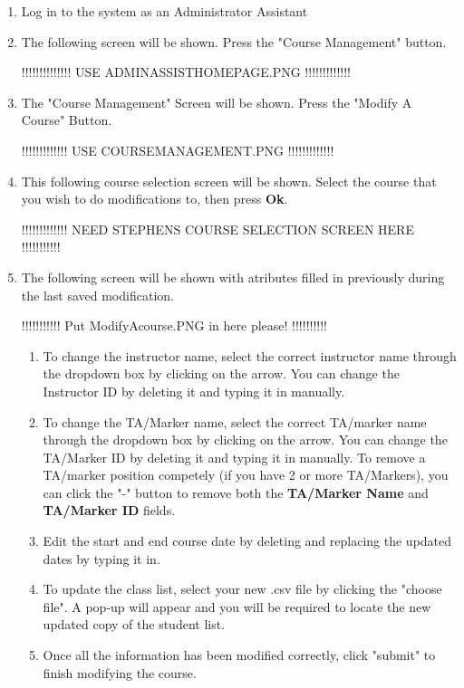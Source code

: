 \documentclass{article}
\begin{document}
\begin{enumerate}
 \item Log in to the system as an Administrator Assistant
\item The following screen will be shown. Press the "Course Management" button.

!!!!!!!!!!!!!! USE ADMINASSISTHOMEPAGE.PNG    !!!!!!!!!!!!!

\item The "Course Management" Screen will be shown. Press the "Modify A Course" Button.


!!!!!!!!!!!!! USE COURSEMANAGEMENT.PNG   !!!!!!!!!!!!!



	\item This following course selection screen will be shown.   Select the course that you wish
    to do modifications to, then press \textbf{Ok}.

	!!!!!!!!!!!!! NEED STEPHENS COURSE SELECTION SCREEN HERE ~ !!!!!!!!!!!

	\item The following screen will be shown with  atributes filled in previously during the last saved modification. 


	!!!!!!!!!!! Put ModifyAcourse.PNG in here please! !!!!!!!!!!


	\begin {enumerate}
		\item To change the instructor name, select the correct instructor name through the dropdown box by clicking on the arrow. You can change the Instructor ID by deleting it and typing it in manually.
	\item To change the TA/Marker name, select the correct TA/marker name through the dropdown box by clicking on the arrow. You can change the TA/Marker ID by deleting it and typing it in manually. To remove a TA/marker position competely (if you have 2 or more TA/Markers), you can click the "-" button to remove both the \textbf{TA/Marker Name} and \textbf{TA/Marker ID} fields.
	\item Edit the start and end course date by deleting and replacing the updated dates by typing it in.
	\item To update the class list, select your new .csv file by clicking the "choose file". A pop-up will appear and you will be required to locate the new updated copy of the student list.
	\item Once all the information has been modified correctly, click "submit" to finish modifying the course.
	\end {enumerate}
\end {enumerate}
\end{document}

